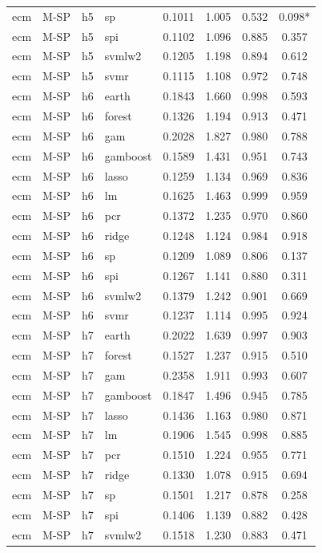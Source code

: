 \begin{ThreePartTable}
\begin{longtable}[t]{llclcccc}
ecm & M-SP & h5 & sp & 0.1011 & 1.005 & 0.532 & 0.098*\\
ecm & M-SP & h5 & spi & 0.1102 & 1.096 & 0.885 & 0.357\\
ecm & M-SP & h5 & svmlw2 & 0.1205 & 1.198 & 0.894 & 0.612\\
ecm & M-SP & h5 & svmr & 0.1115 & 1.108 & 0.972 & 0.748\\
\addlinespace
ecm & M-SP & h6 & earth & 0.1843 & 1.660 & 0.998 & 0.593\\
ecm & M-SP & h6 & forest & 0.1326 & 1.194 & 0.913 & 0.471\\
ecm & M-SP & h6 & gam & 0.2028 & 1.827 & 0.980 & 0.788\\
ecm & M-SP & h6 & gamboost & 0.1589 & 1.431 & 0.951 & 0.743\\
ecm & M-SP & h6 & lasso & 0.1259 & 1.134 & 0.969 & 0.836\\
ecm & M-SP & h6 & lm & 0.1625 & 1.463 & 0.999 & 0.959\\
ecm & M-SP & h6 & pcr & 0.1372 & 1.235 & 0.970 & 0.860\\
ecm & M-SP & h6 & ridge & 0.1248 & 1.124 & 0.984 & 0.918\\
ecm & M-SP & h6 & sp & 0.1209 & 1.089 & 0.806 & 0.137\\
ecm & M-SP & h6 & spi & 0.1267 & 1.141 & 0.880 & 0.311\\
ecm & M-SP & h6 & svmlw2 & 0.1379 & 1.242 & 0.901 & 0.669\\
ecm & M-SP & h6 & svmr & 0.1237 & 1.114 & 0.995 & 0.924\\
\addlinespace
ecm & M-SP & h7 & earth & 0.2022 & 1.639 & 0.997 & 0.903\\
ecm & M-SP & h7 & forest & 0.1527 & 1.237 & 0.915 & 0.510\\
ecm & M-SP & h7 & gam & 0.2358 & 1.911 & 0.993 & 0.607\\
ecm & M-SP & h7 & gamboost & 0.1847 & 1.496 & 0.945 & 0.785\\
ecm & M-SP & h7 & lasso & 0.1436 & 1.163 & 0.980 & 0.871\\
ecm & M-SP & h7 & lm & 0.1906 & 1.545 & 0.998 & 0.885\\
ecm & M-SP & h7 & pcr & 0.1510 & 1.224 & 0.955 & 0.771\\
ecm & M-SP & h7 & ridge & 0.1330 & 1.078 & 0.915 & 0.694\\
ecm & M-SP & h7 & sp & 0.1501 & 1.217 & 0.878 & 0.258\\
ecm & M-SP & h7 & spi & 0.1406 & 1.139 & 0.882 & 0.428\\
ecm & M-SP & h7 & svmlw2 & 0.1518 & 1.230 & 0.883 & 0.471\\

\end{longtable}
\end{ThreePartTable}
